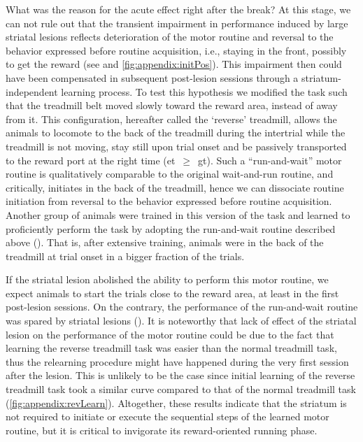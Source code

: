 What was the reason for the acute effect right after the break?
At this stage, we can not rule out that the transient impairment in performance induced by large striatal lesions reflects deterioration of the motor routine and reversal to the behavior expressed before routine acquisition, i.e., staying in the front, possibly to get the reward (see  and \autoref{fig:appendix:initPos}).
This impairment then could have been compensated in subsequent post-lesion sessions through a striatum-independent learning process.
To test this hypothesis we modified the task such that the treadmill belt moved slowly toward the reward area, instead of away from it.
This configuration, hereafter called the `reverse' treadmill, allows the animals to locomote to the back of the treadmill during the intertrial while the treadmill is not moving, stay still upon trial onset and be passively transported to the reward port at the right time (\gls{et}~$\geq$~\gls{gt}).
Such a ``run-and-wait'' motor routine is qualitatively comparable to the original wait-and-run routine, and critically, initiates in the back of the treadmill, hence we can dissociate routine initiation from reversal to the behavior expressed before routine acquisition.
Another group of animals were trained in this version of the task and learned to proficiently perform the task by adopting the run-and-wait routine described above ().
That is, after extensive training, animals were in the back of the treadmill at trial onset in a bigger fraction of the trials.

If the striatal lesion abolished the ability to perform this motor routine, we expect animals to start the trials close to the reward area, at least in the first post-lesion sessions.
On the contrary, the performance of the run-and-wait routine was spared by striatal lesions ().
It is noteworthy that lack of effect of the striatal lesion on the performance of the motor routine could be due to the fact that learning the reverse treadmill task was easier than the normal treadmill task, thus the relearning procedure might have happened during the very first session after the lesion.
This is unlikely to be the case since initial learning of the reverse treadmill task took a similar curve compared to that of the normal treadmill task (\autoref{fig:appendix:revLearn}).
Altogether, these results indicate that the striatum is not required to initiate or execute the sequential steps of the learned motor routine, but it is critical to invigorate its reward-oriented running phase.


